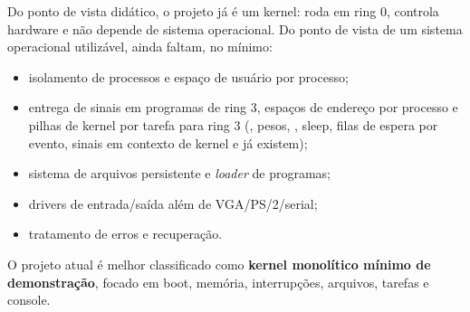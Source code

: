 Do ponto de vista did\'atico, o projeto j\'a \'e um kernel: roda em ring 0,
controla hardware e n\~ao depende de sistema operacional. Do ponto de vista
de um sistema operacional utiliz\'avel, ainda faltam, no m\'inimo:

\begin{itemize}
  \item isolamento de processos e espa\c{c}o de usu\'ario por processo;
  \item entrega de sinais em programas de ring 3, espa\c{c}os de endere\c{c}o
        por processo e pilhas de kernel por tarefa para ring 3
        (, pesos, , sleep, filas de espera por
        evento, sinais em contexto de kernel e  j\'a existem);
  \item sistema de arquivos persistente e \emph{loader} de programas;
  \item drivers de entrada/sa\'ida al\'em de VGA/PS/2/serial;
  \item tratamento de erros e recupera\c{c}\~ao.
\end{itemize}

O projeto atual \'e melhor classificado como \textbf{kernel monol\'itico
m\'inimo de demonstra\c{c}\~ao}, focado em boot, mem\'oria,
interrup\c{c}\~oes, arquivos, tarefas e console.
